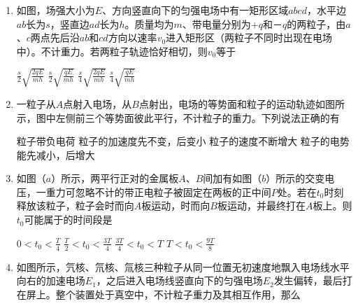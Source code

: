 \begin{enumerate}[leftmargin=0em]
\item
{}
如图，场强大小为$ E $、方向竖直向下的匀强电场中有一矩形区域$ abcd $，水平边$ ab $长为$ s $，竖直边$ ad $长为$ h $。质量均为$ m $、带电量分别为$ +q $和－$ q $的两粒子，由$ a $、$ c $两点先后沿$ ab $和$ cd $方向以速率$ v_{0} $进入矩形区（两粒子不同时出现在电场中）。不计重力。若两粒子轨迹恰好相切，则$ v_{0} $等于  
\begin{figure}[h!]
\centering

\end{figure}
\fourchoices
{$\frac { s } { 2 } \sqrt { \frac { 2 q E } { m h } }$}
{$\frac { s } { 2 } \sqrt { \frac { q E } { m h } }$}
{$\frac { s } { 4 } \sqrt { \frac { 2 q E } { m h } }$}
{$\frac { s } { 4 } \sqrt { \frac { q E } { m h } }$}





\item
{}
一粒子从$ A $点射入电场，从$ B $点射出，电场的等势面和粒子的运动轨迹如图所示，图中左侧前三个等势面彼此平行，不计粒子的重力。下列说法正确的有  
\begin{figure}[h!]
\centering

\end{figure}


\fourchoices
{粒子带负电荷}
{粒子的加速度先不变，后变小}
{粒子的速度不断增大}
{粒子的电势能先减小，后增大}





\item
{}
如图（$ a $）所示，两平行正对的金属板$ A $、$ B $间加有如图（$ b $）所示的交变电压，一重力可忽略不计的带正电粒子被固定在两板的正中间$ P $处。若在$ t_{0} $时刻释放该粒子，粒子会时而向$ A $板运动，时而向$ B $板运动，并最终打在$ A $板上。则$ t_{0} $可能属于的时间段是  
\begin{figure}[h!]
\centering

\end{figure}
\fourchoices
{$0 < t _ { 0 } < \frac { T } { 4 }$}
{$\frac { T } { 2 } < t _ { 0 } < \frac { 3 T } { 4 }$}
{$\frac { 3 T } { 4 } < t _ { 0 } < T$}
{$T < t _ { 0 } < \frac { 9 T } { 8 }$}




\item
{}
如图所示，氕核、氘核、氚核三种粒子从同一位置无初速度地飘入电场线水平向右的加速电场$ E_{1} $，之后进入电场线竖直向下的匀强电场$ E_{2} $发生偏转，最后打在屏上。整个装置处于真空中，不计粒子重力及其相互作用，那么  
\begin{figure}[h!]
\centering

\end{figure}



\end{enumerate}
